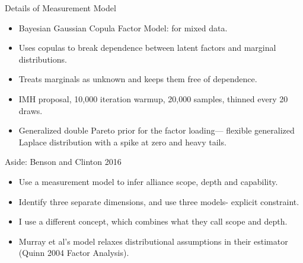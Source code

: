 \documentclass[12pt]{beamer}
\begin{document}

\begin{frame}{Details of Measurement Model}

\begin{itemize}
\item Bayesian Gaussian Copula Factor Model: for mixed data. 
\item Uses copulas to break dependence between latent factors and marginal distributions. 
\item Treats marginals as unknown and keeps them free of dependence. 
\item IMH proposal, 10,000 iteration warmup, 20,000 samples, thinned every 20 draws. 
\item Generalized double Pareto prior for the factor loading--- flexible generalized Laplace distribution with a spike at zero and heavy tails. 
\end{itemize} 


\end{frame}




\begin{frame}{Aside: Benson and Clinton 2016}

\begin{itemize}
\item Use a measurement model to infer alliance scope, depth and capability. 
\item Identify three separate dimensions, and use three models- explicit constraint. 
\item I use a different concept, which combines what they call scope and depth. 
\item Murray et al's model relaxes distributional assumptions in their estimator (Quinn 2004 Factor Analysis). 
\end{itemize}


\end{frame}

\end{document}
